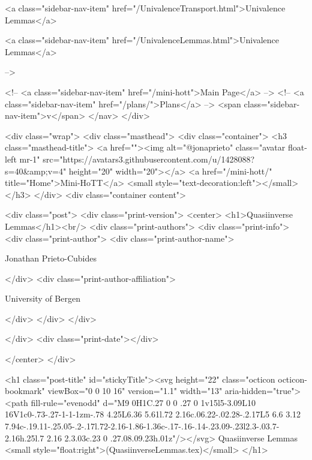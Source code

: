       
    
      
        
          <a class="sidebar-nav-item" href="/UnivalenceTransport.html">Univalence Lemmas</a>
        
      
    
      
        
          <a class="sidebar-nav-item" href="/UnivalenceLemmas.html">Univalence Lemmas</a>
        
      
     -->

    <!-- <a class="sidebar-nav-item" href="/mini-hott">Main Page</a> -->
    <!-- <a class="sidebar-nav-item" href="/plans/">Plans</a> -->
    <span class="sidebar-nav-item">v</span>
  </nav>
</div>

    <div class="wrap">
      <div class="masthead">
        <div class="container">
          <h3 class="masthead-title">
            <a href=""><img alt="@jonaprieto" class="avatar float-left mr-1" src="https://avatars3.githubusercontent.com/u/1428088?s=40&amp;v=4" height="20" width="20"></a>
            <a href="/mini-hott/" title="Home">Mini-HoTT</a>
            <small style="text-decoration:left"></small>
          </h3>
        </div>
      <div class="container content">
        







<div class="post">
  <div class="print-version">
    <center>
      <h1>Quasiinverse Lemmas</h1><br/>
        <div class="print-authors">
          <div class="print-info">
            <div class="print-author">
              <div class="print-author-name">
                
                  Jonathan Prieto-Cubides
                
              </div>
              <div class="print-author-affiliation">
                
                  University of Bergen
                
                </div>
            </div>
          </div>
          
          
        </div>
        <div class="print-date"></div>
        
        
    </center>
  </div>

  

  <h1 class="post-title" id="stickyTitle"><svg height="22" class="octicon octicon-bookmark" viewBox="0 0 10 16" version="1.1" width="13" aria-hidden="true"><path fill-rule="evenodd" d="M9 0H1C.27 0 0 .27 0 1v15l5-3.09L10 16V1c0-.73-.27-1-1-1zm-.78 4.25L6.36 5.61l.72 2.16c.06.22-.02.28-.2.17L5 6.6 3.12 7.94c-.19.11-.25.05-.2-.17l.72-2.16-1.86-1.36c-.17-.16-.14-.23.09-.23l2.3-.03.7-2.16h.25l.7 2.16 2.3.03c.23 0 .27.08.09.23h.01z"/></svg> Quasiinverse Lemmas <small style="float:right">(QuasiinverseLemmas.tex)</small>
  </h1>

